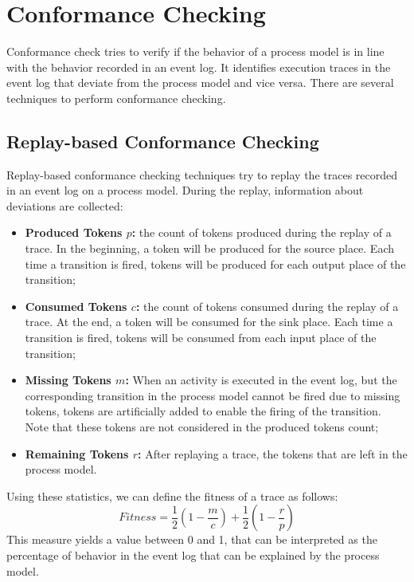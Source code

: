 \section{Conformance Checking}
Conformance check tries to verify if the behavior of a process model is in line with the behavior recorded in an event log.
It identifies execution traces in the event log that deviate from the process model and vice versa.
There are several techniques to perform conformance checking.

\subsection{Replay-based Conformance Checking}
Replay-based conformance checking techniques try to replay the traces recorded in an event log on a process model.
During the replay, information about deviations are collected:
\begin{itemize}
    \item \textbf{Produced Tokens $p$:} the count of tokens produced during the replay of a trace. In the beginning, a token will be produced for the source place.
    Each time a transition is fired, tokens will be produced for each output place of the transition;
    \item \textbf{Consumed Tokens $c$:} the count of tokens consumed during the replay of a trace. At the end, a token will be consumed for the sink place.
    Each time a transition is fired, tokens will be consumed from each input place of the transition;
    \item \textbf{Missing Tokens $m$:} When an activity is executed in the event log, but the corresponding transition in the process model cannot be fired due to missing tokens,
    tokens are artificially added to enable the firing of the transition. Note that these tokens are not considered in the produced tokens count;
    \item \textbf{Remaining Tokens $r$:} After replaying a trace, the tokens that are left in the process model.
\end{itemize}
Using these statistics, we can define the fitness of a trace as follows:
\begin{equation}
    \label{eq:fitness}
    Fitness = \frac{1}{2}(1 - \frac{m}{c}) + \frac{1}{2} (1 - \frac{r}{p})
\end{equation}
This measure yields a value between 0 and 1, that can be interpreted as the percentage of behavior in the event log that can be explained by the process model.
